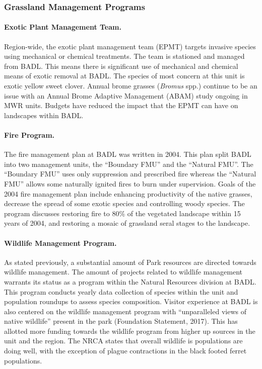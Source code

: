 \subsubsection{Grassland Management Programs}

\paragraph{Exotic Plant Management Team.} Region-wide, the exotic plant management team (EPMT) targets invasive species using mechanical or chemical treatments. 
The team is stationed and managed from BADL.
This means there is significant use of mechanical and chemical means of exotic removal at BADL. 
The species of most concern at this unit is exotic yellow sweet clover. 
Annual brome grasses (\emph{Bromus} spp.) continue to be an issue with an Annual Brome Adaptive Management (ABAM) study ongoing in MWR units.
Budgets have reduced the impact that the EPMT can have on landscapes within BADL.

\paragraph{Fire Program.} The fire management plan at BADL was written in 2004. 
This plan split BADL into two management units, the ``Boundary FMU'' and the ``Natural FMU''. 
The ``Boundary FMU'' uses only suppression and prescribed fire whereas the ``Natural FMU'' allows some naturally ignited fires to burn under supervision.
Goals of the 2004 fire management plan include enhancing productivity of the native grasses, decrease the spread of some exotic species and controlling woody species. 
The program discusses restoring fire to 80\% of the vegetated landscape within 15 years of 2004, and restoring a mosaic of grassland seral stages to the landscape.

\paragraph{Wildlife Management Program.} As stated previously, a substantial amount of Park resources are directed towards wildlife management. 
The amount of projects related to wildlife management warrants its status as a program within the Natural Resources division at BADL. 
This program conducts yearly data collection of species within the unit and population roundups to assess species composition. 
Visitor experience at BADL is also centered on the wildlife management program with ``unparalleled views of native wildlife'' present in the park (Foundation Statement, 2017). 
This has allotted more funding towards the wildlife program from higher up sources in the unit and the region. 
The NRCA states that overall wildlife is populations are doing well, with the exception of plague contractions in the black footed ferret populations.

